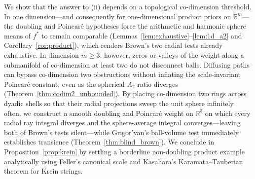 \documentclass[a4paper,11pt,noarxiv]{quantumarticle}
\newcommand{\R}{\mathbb{R}}
\theoremstyle{plain}
\theoremstyle{definition}
\theoremstyle{remark}
\begin{document}
We show that the answer to (ii) depends on a topological co-dimension
threshold. In one dimension---and consequently for one-dimensional
product priors on $\R^m$---the doubling and Poincar\'e hypotheses force
the arithmetic and harmonic sphere means of $f^*$ to remain comparable
(Lemmas~\ref{lem:exhaustive}--\ref{lem:1d_a2} and
Corollary~\ref{cor:product}), which renders Brown's two radial tests
already exhaustive. In dimension $m\ge3$, however, zeros or valleys of
the weight along a submanifold of co-dimension at least two do not
disconnect balls. Diffusing paths can bypass co-dimension two
obstructions without inflating the scale-invariant Poincar\'e constant,
even as the spherical $A_2$ ratio diverges
(Theorem~\ref{thm:codim2_unbounded}). By placing co-dimension two rings
across dyadic shells so that their radial projections sweep the unit
sphere infinitely often, we construct a smooth doubling and Poincar\'e
weight on $\R^3$ on which every radial ray integral diverges and the
sphere-average integral converges---leaving both of Brown's tests
silent---while Grigor'yan's ball-volume test immediately establishes
transience (Theorem~\ref{thm:blind_brown}). We conclude in
Proposition~\ref{prop:krein} by settling a borderline non-doubling
product example analytically using Feller's canonical scale and
Kasahara's Karamata--Tauberian theorem for Krein strings.
\end{document}

